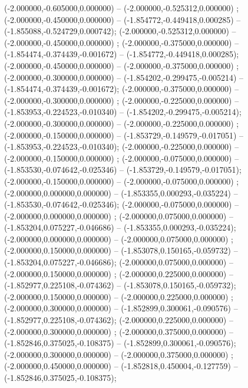  (-2.000000,-0.605000,0.000000) -- (-2.000000,-0.525312,0.000000) ;
 (-2.000000,-0.450000,0.000000) -- (-1.854772,-0.449418,0.000285) -- (-1.855088,-0.524729,0.000742);
 (-2.000000,-0.525312,0.000000) -- (-2.000000,-0.450000,0.000000) ;
 (-2.000000,-0.375000,0.000000) -- (-1.854474,-0.374439,-0.001672) -- (-1.854772,-0.449418,0.000285);
 (-2.000000,-0.450000,0.000000) -- (-2.000000,-0.375000,0.000000) ;
 (-2.000000,-0.300000,0.000000) -- (-1.854202,-0.299475,-0.005214) -- (-1.854474,-0.374439,-0.001672);
 (-2.000000,-0.375000,0.000000) -- (-2.000000,-0.300000,0.000000) ;
 (-2.000000,-0.225000,0.000000) -- (-1.853953,-0.224523,-0.010340) -- (-1.854202,-0.299475,-0.005214);
 (-2.000000,-0.300000,0.000000) -- (-2.000000,-0.225000,0.000000) ;
 (-2.000000,-0.150000,0.000000) -- (-1.853729,-0.149579,-0.017051) -- (-1.853953,-0.224523,-0.010340);
 (-2.000000,-0.225000,0.000000) -- (-2.000000,-0.150000,0.000000) ;
 (-2.000000,-0.075000,0.000000) -- (-1.853530,-0.074642,-0.025346) -- (-1.853729,-0.149579,-0.017051);
 (-2.000000,-0.150000,0.000000) -- (-2.000000,-0.075000,0.000000) ;
 (-2.000000,0.000000,0.000000) -- (-1.853355,0.000293,-0.035224) -- (-1.853530,-0.074642,-0.025346);
 (-2.000000,-0.075000,0.000000) -- (-2.000000,0.000000,0.000000) ;
 (-2.000000,0.075000,0.000000) -- (-1.853204,0.075227,-0.046686) -- (-1.853355,0.000293,-0.035224);
 (-2.000000,0.000000,0.000000) -- (-2.000000,0.075000,0.000000) ;
 (-2.000000,0.150000,0.000000) -- (-1.853078,0.150165,-0.059732) -- (-1.853204,0.075227,-0.046686);
 (-2.000000,0.075000,0.000000) -- (-2.000000,0.150000,0.000000) ;
 (-2.000000,0.225000,0.000000) -- (-1.852977,0.225108,-0.074362) -- (-1.853078,0.150165,-0.059732);
 (-2.000000,0.150000,0.000000) -- (-2.000000,0.225000,0.000000) ;
 (-2.000000,0.300000,0.000000) -- (-1.852899,0.300061,-0.090576) -- (-1.852977,0.225108,-0.074362);
 (-2.000000,0.225000,0.000000) -- (-2.000000,0.300000,0.000000) ;
 (-2.000000,0.375000,0.000000) -- (-1.852846,0.375025,-0.108375) -- (-1.852899,0.300061,-0.090576);
 (-2.000000,0.300000,0.000000) -- (-2.000000,0.375000,0.000000) ;
 (-2.000000,0.450000,0.000000) -- (-1.852818,0.450004,-0.127759) -- (-1.852846,0.375025,-0.108375);
